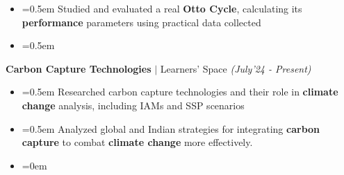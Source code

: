 \documentclass{article}
\begin{document}
\vspace{-5pt}
\begin{itemize}[label=\textcolor{myblue}{\textbullet},itemsep = -1.25mm, leftmargin=5.5mm]
 
\item{}\font=0.5em Studied and evaluated a real \textbf{Otto Cycle}, calculating its \textbf{performance} parameters using practical data collected
\item{}\font=0.5em 
 
\end{itemize}
{\fontsize{12}{12} \textbf{Carbon Capture Technologies} $|$ Learners' Space}  \hfill{\sl \small (July'24 - Present)}
\vspace{-7pt}
\begin{itemize}[label=\textcolor{myblue}{\textbullet},itemsep = -1.25mm, leftmargin=5.5mm]
\item{}\font=0.5em Researched carbon capture technologies and their role in \textbf{climate change} analysis, including IAMs and SSP scenarios
\item{}\font=0.5em Analyzed global and Indian strategies for integrating \textbf{carbon capture} to combat \textbf{climate change} more effectively.
\item{}\font=0em 
\end{itemize}
\end{document}
